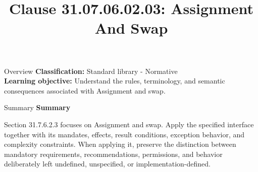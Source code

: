 \documentclass[10pt,letterpaper]{article}
\title{Clause 31.07.06.02.03: Assignment And Swap}
\author{}
\date{}
\begin{document}
\maketitle
\begin{CornellOverviewBox}{Overview}
\textbf{Classification:} Standard library - Normative\\[2pt]
\textbf{Learning objective:} Understand the rules, terminology, and semantic consequences associated with Assignment and swap.
\end{CornellOverviewBox}\begin{CornellSummaryBox}{Summary}
{\sffamily\bfseries\color{Accent} Summary}\par\vspace{3pt}Section 31.7.6.2.3 focuses on Assignment and swap. Apply the specified interface together with its mandates, effects, result conditions, exception behavior, and complexity constraints. When applying it, preserve the distinction between mandatory requirements, recommendations, permissions, and behavior deliberately left undefined, unspecified, or implementation-defined.
\end{CornellSummaryBox}
\end{document}
